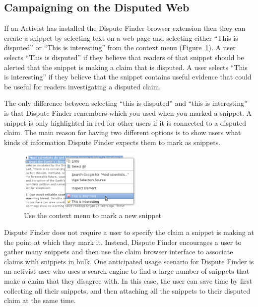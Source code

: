 \documentclass{www2010-submission}
\newcommand{\todo}[1]{}
\begin{document}
\subsection{Campaigning on the Disputed Web}

If an Activist has installed the Dispute Finder browser extension then they can create a snippet by selecting text on a web page and selecting either ``This is disputed'' or ``This is interesting'' from the context menu (Figure~\ref{createprocess}). A user selects ``This is disputed'' if they believe that readers of that snippet should be alerted that the snippet is making a claim that is disputed. A user selects ``This is interesting'' if they believe that the snippet contains useful evidence that could be useful for readers investigating a disputed claim. 

The only difference between selecting ``this is disputed'' and ``this is interesting'' is that Dispute Finder remembers which you used when you marked a snippet. A snippet is only highlighted in red for other users if it is connected to a disputed claim. The main reason for having two different options is to show users what kinds of information Dispute Finder expects them to mark as snippets.
\todo{Say something smart about the difference}

\begin{figure}[tb]
	\begin{center}
	\includegraphics[width=6cm]{../screenshots/v2_snipmark.png}
	\caption{Use the context menu to mark a new snippet}
	\label{createprocess}
	\end{center}
\end{figure}

Dispute Finder does not require a user to specify the claim a snippet is making at the point at which they mark it. Instead, Dispute Finder encourages a user to gather many snippets and then use the claim browser interface to associate claims with snippets in bulk.
One anticipated usage scenario for Dispute Finder is an activist user who uses a search engine to find a large number of snippets that make a claim that they disagree with. 
In this case, the user can save time by first collecting all their snippets, and then attaching all the snippets to their disputed claim at the same time.
\end{document}
